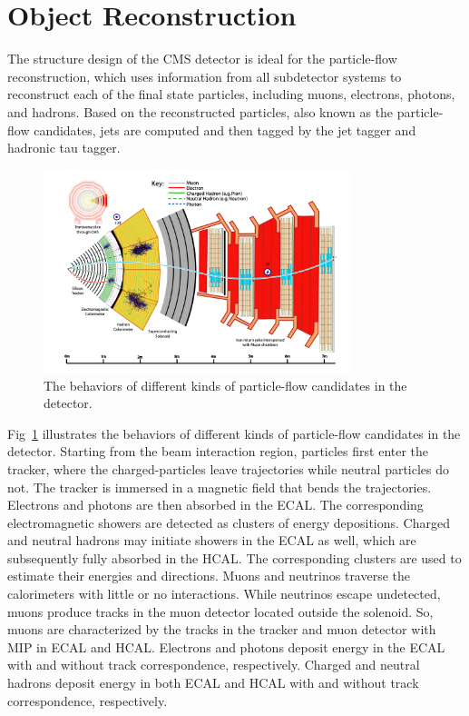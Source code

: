 
\section{Object Reconstruction}
\label{sec:cmsexperiment:reconstruction}

The structure design of the CMS detector is ideal for the particle-flow reconstruction, which uses information from all subdetector systems to reconstruct each of the final state particles, including muons, electrons, photons, and hadrons. Based on the reconstructed particles, also known as the particle-flow candidates, jets are computed and then tagged by the \PQb jet tagger and hadronic tau tagger.

\begin{figure}[ht]
    \centering
    \includegraphics[width=0.8\textwidth]{chapters/CMSExperiment/sectionReconstruction/figures/pfa.png}
    \caption{The behaviors of different kinds of particle-flow candidates in the detector.}
    \label{fig:cmsexperiment:reconstruction:pfa}
\end{figure}

Fig~\ref{fig:cmsexperiment:reconstruction:pfa} illustrates the behaviors of different kinds of particle-flow candidates in the detector. Starting from the beam interaction region, particles first enter the tracker, where the charged-particles leave trajectories while neutral particles do not. The tracker is immersed in a magnetic field that bends the trajectories. Electrons and photons are then absorbed in the ECAL. The corresponding electromagnetic showers are detected as clusters of energy depositions. Charged and neutral hadrons may initiate showers in the ECAL as well, which are subsequently fully absorbed in the HCAL. The corresponding clusters are used to estimate their energies and directions. Muons and neutrinos traverse the calorimeters with little or no interactions. While neutrinos escape undetected, muons produce tracks in the muon detector located outside the solenoid. So, muons are characterized by the tracks in the tracker and muon detector with MIP in ECAL and HCAL. Electrons and photons deposit energy in the ECAL with and without track correspondence, respectively. Charged and neutral hadrons deposit energy in both ECAL and HCAL with and without track correspondence, respectively. 


